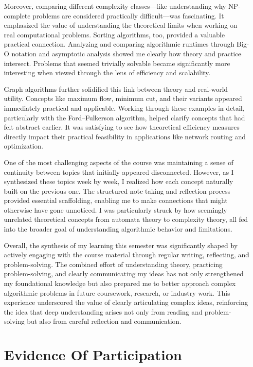 \documentclass{article}
\theoremstyle{theorem}
\theoremstyle{definition}
\theoremstyle{remark}
\begin{document}
Moreover, comparing different complexity classes—like understanding why NP-complete problems are considered practically difficult—was fascinating. It emphasized the value of understanding the theoretical limits when working on real computational problems. Sorting algorithms, too, provided a valuable practical connection. Analyzing and comparing algorithmic runtimes through Big-O notation and asymptotic analysis showed me clearly how theory and practice intersect. Problems that seemed trivially solvable became significantly more interesting when viewed through the lens of efficiency and scalability.

Graph algorithms further solidified this link between theory and real-world utility. Concepts like maximum flow, minimum cut, and their variants appeared immediately practical and applicable. Working through these examples in detail, particularly with the Ford–Fulkerson algorithm, helped clarify concepts that had felt abstract earlier. It was satisfying to see how theoretical efficiency measures directly impact their practical feasibility in applications like network routing and optimization. 

One of the most challenging aspects of the course was maintaining a sense of continuity between topics that initially appeared disconnected. However, as I synthesized these topics week by week, I realized how each concept naturally built on the previous one. The structured note-taking and reflection process provided essential scaffolding, enabling me to make connections that might otherwise have gone unnoticed. I was particularly struck by how seemingly unrelated theoretical concepts from automata theory to complexity theory, all fed into the broader goal of understanding algorithmic behavior and limitations.

Overall, the synthesis of my learning this semester was significantly shaped by actively engaging with the course material through regular writing, reflecting, and problem-solving. The combined effort of understanding theory, practicing problem-solving, and clearly communicating my ideas has not only strengthened my foundational knowledge but also prepared me to better approach complex algorithmic problems in future coursework, research, or industry work. This experience underscored the value of clearly articulating complex ideas, reinforcing the idea that deep understanding arises not only from reading and problem-solving but also from careful reflection and communication.


\section{Evidence Of Participation}
\end{document}
